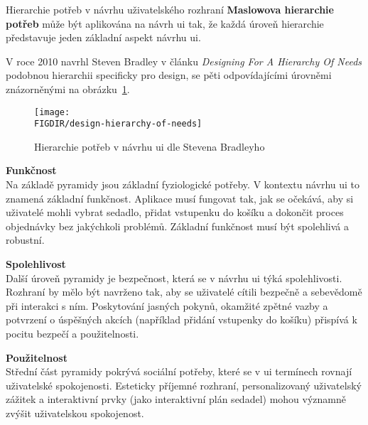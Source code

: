 \newpage
\begin{subsection}{Hierarchie potřeb v návrhu uživatelského rozhraní}
    \label{subsec:navrh-uzivatelskeho-rozhrani-psychologie-hierarchie}
    \textbf{Maslowova hierarchie potřeb} může být aplikována na návrh \ac{ui} tak, že každá úroveň hierarchie představuje jeden základní aspekt návrhu \ac{ui}.

    V roce 2010 navrhl Steven Bradley v článku \textit{Designing For A Hierarchy Of Needs} podobnou hierarchii specificky pro design, se pěti odpovídajícími úrovněmi znázorněnými na obrázku~\ref{fig:design-hierarchy-of-needs}.\cite{bradley_hierarchy_of_needs}

    \begin{figure}[H]
        \centering
        \caption{Hierarchie potřeb v návrhu \ac{ui} dle Stevena Bradleyho}
        \texttt{[image: \\FIGDIR/design-hierarchy-of-needs]}
        \label{fig:design-hierarchy-of-needs}
    \end{figure}

    \textbf{Funkčnost}\\
    Na základě pyramidy jsou základní fyziologické potřeby.
    V kontextu návrhu \ac{ui} to znamená základní funkčnost.
    Aplikace musí fungovat tak, jak se očekává, aby si uživatelé mohli vybrat sedadlo, přidat vstupenku do košíku a dokončit proces objednávky bez jakýchkoli problémů.
    Základní funkčnost musí být spolehlivá a robustní.

    \textbf{Spolehlivost}\\
    Další úroveň pyramidy je bezpečnost, která se v návrhu \ac{ui} týká spolehlivosti.
    Rozhraní by mělo být navrženo tak, aby se uživatelé cítili bezpečně a sebevědomě při interakci s ním.
    Poskytování jasných pokynů, okamžité zpětné vazby a potvrzení o úspěšných akcích (například přidání vstupenky do košíku) přispívá k pocitu bezpečí a použitelnosti.

    \textbf{Použitelnost}\\
    Střední část pyramidy pokrývá sociální potřeby, které se v \ac{ui} termínech rovnají uživatelské spokojenosti.
    Esteticky příjemné rozhraní, personalizovaný uživatelský zážitek a interaktivní prvky (jako interaktivní plán sedadel) mohou významně zvýšit uživatelskou spokojenost.


\end{subsection}
